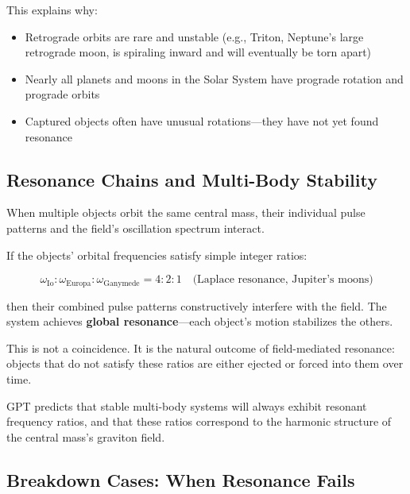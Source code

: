\documentclass[12pt, a4paper]{article}
\begin{document}
This explains why:
\begin{itemize}
    \item Retrograde orbits are rare and unstable (e.g., Triton, Neptune's large retrograde moon, is spiraling inward and will eventually be torn apart)
    \item Nearly all planets and moons in the Solar System have prograde rotation and prograde orbits
    \item Captured objects often have unusual rotations—they have not yet found resonance
\end{itemize}

\subsection{Resonance Chains and Multi-Body Stability}
\label{subsec:resonance_chains}

When multiple objects orbit the same central mass, their individual pulse patterns and the field's oscillation spectrum interact.

If the objects' orbital frequencies satisfy simple integer ratios:

\[
\omega_{\text{Io}} : \omega_{\text{Europa}} : \omega_{\text{Ganymede}} = 4 : 2 : 1 \quad \text{(Laplace resonance, Jupiter's moons)}
\]

then their combined pulse patterns constructively interfere with the field. The system achieves \textbf{global resonance}—each object's motion stabilizes the others.

This is not a coincidence. It is the natural outcome of field-mediated resonance: objects that do not satisfy these ratios are either ejected or forced into them over time.

GPT predicts that stable multi-body systems will always exhibit resonant frequency ratios, and that these ratios correspond to the harmonic structure of the central mass's graviton field.

\subsection{Breakdown Cases: When Resonance Fails}
\label{subsec:breakdown_cases}
\end{document}
